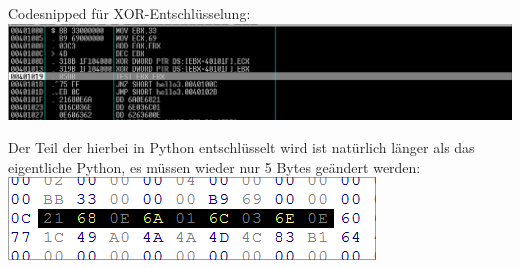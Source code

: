 \documentclass{article}
\begin{document}
	Codesnipped für XOR-Entschlüsselung:\\
	\includegraphics[width=0.5\linewidth]{pictures/hello3-important-code-snipped}\\
	\begin{mynote}
		Der Teil der hierbei in Python entschlüsselt wird ist natürlich länger als das eigentliche Python, es müssen wieder nur 5 Bytes geändert werden:\\
		\includegraphics[width=0.5\linewidth]{pictures/hello3-hex editor}\\
	\end{mynote}
	
\end{document}
